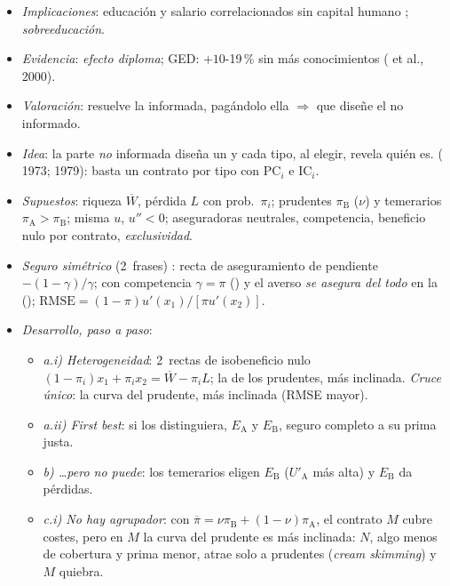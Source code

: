 \documentclass{article}
\begin{document}
\begin{columnas}
\begin{itemize}
\item \emph{Implicaciones}: educación y salario correlacionados sin capital humano ; \emph{sobreeducación}.
\item \emph{Evidencia}: \emph{efecto diploma}; GED: $+10$-19\,\% sin más conocimientos ( et al., 2000).
\item \emph{Valoración}: resuelve la informada, pagándolo ella $\Rightarrow$ que diseñe el no informado.
\end{itemize}
\begin{itemize}
\item \emph{Idea}: la parte \emph{no} informada diseña un  y cada tipo, al elegir, revela quién es.  ( 1973;  1979): basta un contrato por tipo con $\mathrm{PC}_i$ e $\mathrm{IC}_i$.
\item \emph{Supuestos}: riqueza $\overline{W}$, pérdida $L$ con prob.\ $\pi_i$; prudentes $\pi_{\mathrm{B}}$ ($\nu$) y temerarios $\pi_{\mathrm{A}}>\pi_{\mathrm{B}}$; misma $u$, $u''<0$; aseguradoras neutrales, competencia, beneficio nulo por contrato, \emph{exclusividad}.
\item \emph{Seguro simétrico} (2~frases) : recta de aseguramiento de pendiente $-(1-\gamma)/\gamma$; con competencia $\gamma=\pi$ () y el averso \emph{se asegura del todo} en la  (); $\mathrm{RMSE}=(1-\pi)u'(x_1)/[\pi u'(x_2)]$.
\item \emph{Desarrollo, paso a paso}:
  \begin{itemize}
  \item \emph{a.i) Heterogeneidad}: 2~rectas de isobeneficio nulo $(1-\pi_i)x_1+\pi_ix_2=\overline{W}-\pi_iL$; la de los prudentes, más inclinada. \emph{Cruce único}: la curva del prudente, más inclinada (RMSE mayor).
  \item \emph{a.ii) First best}: si los distinguiera, $E_{\mathrm{A}}$ y $E_{\mathrm{B}}$, seguro completo a su prima justa.
  \item \emph{b) \ldots pero no puede}: los temerarios eligen $E_{\mathrm{B}}$ ($U'_{\mathrm{A}}$ más alta) y $E_{\mathrm{B}}$ da pérdidas.
  \item \emph{c.i) No hay agrupador}: con $\overline{\pi}=\nu\pi_{\mathrm{B}}+(1-\nu)\pi_{\mathrm{A}}$, el contrato $M$ cubre costes, pero en $M$ la curva del prudente es más inclinada: $N$, algo menos de cobertura y prima menor, atrae solo a prudentes (\emph{cream skimming}) y $M$ quiebra.

\end{itemize}
\end{itemize}
\end{columnas}
\end{document}
